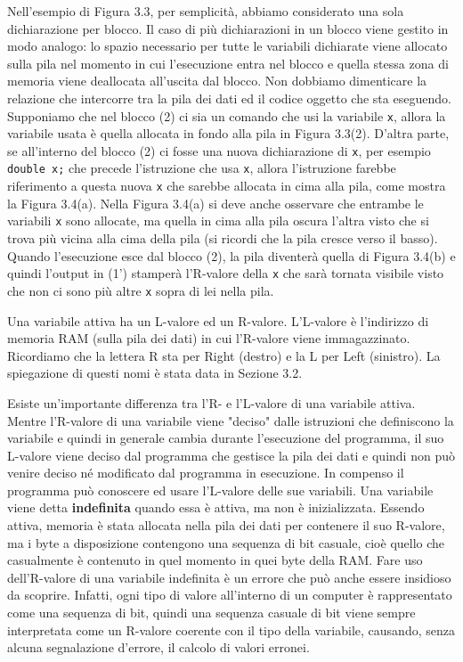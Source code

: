 Nell'esempio di Figura 3.3, per semplicità, abbiamo considerato una sola dichiarazione per blocco.
Il caso di più dichiarazioni in un blocco viene gestito in modo analogo: lo spazio necessario per tutte le variabili dichiarate viene allocato sulla pila nel momento in cui l'esecuzione entra nel blocco e quella stessa zona di memoria viene deallocata all'uscita dal blocco.
Non dobbiamo dimenticare la relazione che intercorre tra la pila dei dati ed il codice oggetto che sta eseguendo.
Supponiamo che nel blocco (2) ci sia un comando che usi la variabile \texttt{x}, allora la variabile usata è quella allocata in fondo alla pila in Figura 3.3(2).
D'altra parte, se all'interno del blocco (2) ci fosse una nuova dichiarazione di \texttt{x}, per esempio \texttt{double x;} che precede l'istruzione che usa \texttt{x}, allora l'istruzione farebbe riferimento a questa nuova \texttt{x} che sarebbe allocata in cima alla pila, come mostra la Figura 3.4(a).
Nella Figura 3.4(a) si deve anche osservare che entrambe le variabili \texttt{x} sono allocate, ma quella in cima alla pila oscura l'altra visto che si trova più vicina alla cima della pila (si ricordi che la pila cresce verso il basso).
Quando l'esecuzione esce dal blocco (2), la pila diventerà quella di Figura 3.4(b) e quindi l'output in (1') stamperà l'R-valore della \texttt{x} che sarà tornata visibile visto che non ci sono più altre \texttt{x} sopra di lei nella pila.

Una variabile attiva ha un L-valore ed un R-valore.
L'L-valore è l'indirizzo di memoria RAM (sulla pila dei dati) in cui l'R-valore viene immagazzinato.
Ricordiamo che la lettera R sta per Right (destro) e la L per Left (sinistro).
La spiegazione di questi nomi è stata data in Sezione 3.2. 

Esiste un'importante differenza tra l'R- e l'L-valore di una variabile attiva.
Mentre l'R-valore di una variabile viene "deciso" dalle istruzioni che definiscono la variabile e quindi in generale cambia durante l'esecuzione del programma, il suo L-valore viene deciso dal programma che gestisce la pila dei dati e quindi non può venire deciso né modificato dal programma in esecuzione.
In compenso il programma può conoscere ed usare l'L-valore delle sue variabili. Una variabile viene detta \textbf{indefinita} quando essa è attiva, ma non è inizializzata.
Essendo attiva, memoria è stata allocata nella pila dei dati per contenere il suo R-valore, ma i byte a disposizione contengono una sequenza di bit casuale, cioè quello che casualmente è contenuto in quel momento in quei byte della RAM.
Fare uso dell'R-valore di una variabile indefinita è un errore che può anche essere insidioso da scoprire.
Infatti, ogni tipo di valore all'interno di un computer è rappresentato come una sequenza di bit, quindi una sequenza casuale di bit viene sempre interpretata come un R-valore coerente con il tipo della variabile, causando, senza alcuna segnalazione d'errore, il calcolo di valori erronei. 

